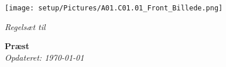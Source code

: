 \documentclass[11pt,a4paper,openright]{report}
\begin{document}
\begin{titlepage}
    \begin{center}
        \texttt{[image: setup/Pictures/A01.C01.01\_Front\_Billede.png]}
        
        \vspace{0.5cm}
        \LARGE
        \textit{Regelsæt til}
        
        \vspace{4.5cm}
        \Huge
        \textbf{Præst}\\
        \vspace{4.5cm}
        \large
        \textit{Opdateret: \today}
\end{center}
\end{titlepage}

\pagestyle{plain} %
\renewcommand*\contentsname{Indholdsfortegnelse}
\tableofcontents







\end{document}
